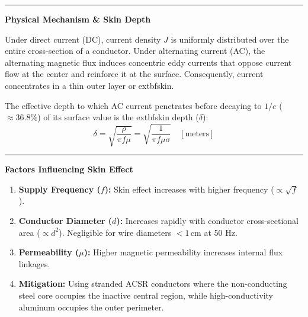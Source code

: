 \documentclass[11pt,a4paper]{article}
\newcommand{\concept}[1]{%
  \vspace{3pt}\noindent\textcolor{AnthGreen}{\rule{3.5pt}{10pt}}\enspace
  \textbf{\sffamily\color{AnthDark}#1}\par\vspace{2pt}%
}
\begin{document}
\concept{Physical Mechanism \& Skin Depth}
Under direct current (DC), current density $J$ is uniformly distributed over the entire cross-section of a conductor. Under alternating current (AC), the alternating magnetic flux induces concentric eddy currents that oppose current flow at the center and reinforce it at the surface. Consequently, current concentrates in a thin outer layer or 	extbf{skin}.

\begin{center}
\end{center}

The effective depth to which AC current penetrates before decaying to $1/e$ ($\approx 36.8\%$) of its surface value is the 	extbf{skin depth ($\delta$)}:
\begin{equation}
  \delta = \sqrt{\frac{\rho}{\pi f \mu}} = \sqrt{\frac{1}{\pi f \mu \sigma}} \quad [\text{meters}]
\end{equation}

\concept{Factors Influencing Skin Effect}
\begin{enumerate}
  \item \textbf{Supply Frequency ($f$):} Skin effect increases with higher frequency ($\propto \sqrt{f}$).
  \item \textbf{Conductor Diameter ($d$):} Increases rapidly with conductor cross-sectional area ($\propto d^2$). Negligible for wire diameters $<1\,\text{cm}$ at 50 Hz.
  \item \textbf{Permeability ($\mu$):} Higher magnetic permeability increases internal flux linkages.
  \item \textbf{Mitigation:} Using stranded ACSR conductors where the non-conducting steel core occupies the inactive central region, while high-conductivity aluminum occupies the outer perimeter.
\end{enumerate}
\end{document}
